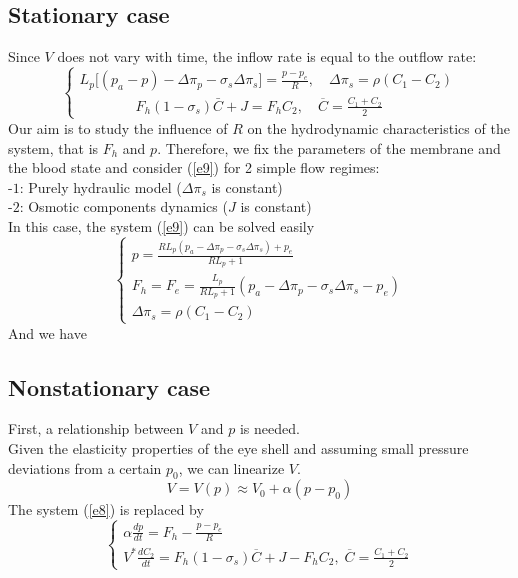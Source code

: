 \documentclass[english,12pt]{article}
\begin{document}
\subsection{Stationary case}
Since $V$ does not vary with time, the inflow rate is equal to the outflow rate:
\begin{equation}\label{e9}
\left\{\begin{array}{ll}
L_p \big[ (p_a-p)- \Delta\pi_{p}-\sigma_{s} \Delta\pi_{s}\big]=\displaystyle{\frac{p-p_{e}}{R}}, \quad \Delta\pi_{s}=\rho(C_1-C_{2})\\
\qquad\qquad F_h (1-\sigma_s) \bar{C}+J=F_h C_2, \quad\overline{C}= \displaystyle{\frac{C_1+C_2}{2}}
\end{array}\right.
\end{equation}
Our aim is to study the influence of $R$ on the hydrodynamic characteristics of the system, that is $F_h$ and $p$. Therefore, we fix the parameters of the membrane and the blood state and consider (\ref{e9}) for 2 simple flow regimes:\\
-$1$: Purely hydraulic model ($\Delta\pi_s$ is constant)\\
-$2$: Osmotic components dynamics ($J$ is constant)\\
In this case, the system (\ref{e9}) can be solved easily
\begin{equation}\label{e10}
\left\{\begin{array}{ll}
p=\displaystyle{\frac{R L_p(p_a-\Delta\pi_{p}-\sigma_{s} \Delta\pi_{s})+p_e}{R L_p+1}}\\
F_h=F_e=\displaystyle{\frac{L_p}{R L_p +1}}(p_a-\Delta\pi_{p}-\sigma_{s} \Delta\pi_{s}-p_e)\\
\Delta\pi_{s}=\rho(C_1-C_{2})
\end{array}\right.
\end{equation}
And we have

\subsection{Nonstationary case}
First, a relationship between $V$ and $p$ is needed.\\
Given the elasticity properties of the eye shell and assuming small pressure deviations from a certain $p_0$, we can linearize $V$.
\begin{equation}
V = V(p) \approx V_0 + \alpha (p-p_0)
\end{equation}
The system (\ref{e8}) is replaced by
\begin{equation}\label{e9}
\left\{\begin{array}{ll}
 \alpha \displaystyle{\frac{dp}{dt}}=F_{h}-\displaystyle{\frac{p-p_e}{R}}\\
V^{\ast} \displaystyle{\frac{dC_{2}}{dt}}= F_h(1-\sigma_s)\overline{C} + J - F_hC_2,\; \overline{C}= \frac{C_1+C_2}{2}
\end{array}\right.
\end{equation}
\end{document}
